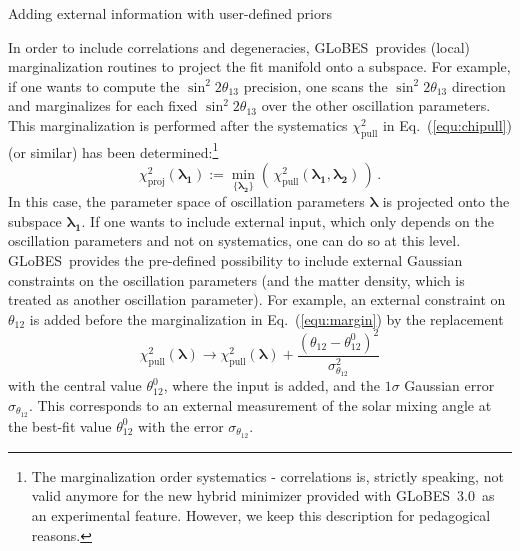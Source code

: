 \documentclass[12pt,a4paper]{article}
\makeatletter
\renewcommand{\section}{\@startsection{section}{1}{0em}{-\baselineskip}%
{\baselineskip}{\normalfont\large\bfseries}}
\newcommand{\eq}{Eq.}
\newcommand{\stheta}{\sin^2 2 \theta_{13}}
\newcommand{\GLOBES}{{\sf GLoBES}}
\newcommand{\GLOBESN}{{\sf GLoBES~3.0}}
\newcommand{\equ}[1]{\eq~(\ref{equ:#1})}
\makeatother
\begin{document}
\section{Adding external information with user-defined priors}

In order to include correlations and degeneracies, \GLOBES\ provides
(local) marginalization routines to project the fit manifold onto
a subspace. For example, if one wants to compute the $\stheta$ precision,
one scans the $\stheta$ direction and marginalizes for each fixed $\stheta$
over the other oscillation parameters. This marginalization is performed
after the systematics $\chi^2_{\mathrm{pull}}$ in \equ{chipull} (or similar) 
has been determined:\footnote{The marginalization order systematics - correlations
is, strictly speaking, not valid anymore for the new hybrid minimizer provided
with \GLOBESN\ as an experimental feature. However, we keep this description
for pedagogical reasons.}
\begin{equation}
 \chi^2_{\mathrm{proj}}(\boldsymbol{\lambda_1}) := \min_{\{ \boldsymbol{\lambda_2} \} } \left( \, \chi^2_{\mathrm{pull}} (\boldsymbol{\lambda_1} , \boldsymbol{\lambda_2} ) \, \right) \, .
\label{equ:margin}
\end{equation}
In this case, the parameter space of oscillation parameters 
$\boldsymbol{\lambda}$ is projected onto the subspace $\boldsymbol{\lambda_1}$.
If one wants to include external input, which only depends on the oscillation
parameters and not on systematics, one can do so at this level. \GLOBES\ provides
the pre-defined possibility to include external Gaussian constraints on the 
oscillation parameters (and the matter density, which is treated as another
oscillation parameter). For example, an external constraint on $\theta_{12}$
is added before the marginalization in \equ{margin} by the replacement
\begin{equation}
 \chi^2_{\mathrm{pull}}(\boldsymbol{\lambda}) \rightarrow \chi^2_{\mathrm{pull}}(\boldsymbol{\lambda})  +
 \frac{(\theta_{12} - \theta_{12}^0)^2}{\sigma_{\theta_{12}}^2}
\label{equ:priors}
\end{equation}
with the central value $\theta_{12}^0$, where the input is added, and
the $1\sigma$ Gaussian error $\sigma_{\theta_{12}}$. This corresponds to an external
measurement of the solar mixing angle at the best-fit value $\theta_{12}^0$
with the error $\sigma_{\theta_{12}}$. 
\end{document}
